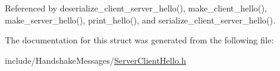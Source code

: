 Referenced by deserialize\+\_\+client\+\_\+server\+\_\+hello(), make\+\_\+client\+\_\+hello(), make\+\_\+server\+\_\+hello(), print\+\_\+hello(), and serialize\+\_\+client\+\_\+server\+\_\+hello().



The documentation for this struct was generated from the following file\+:\begin{DoxyCompactItemize}
\item 
include/\+Handshake\+Messages/\hyperlink{_server_client_hello_8h}{Server\+Client\+Hello.\+h}\end{DoxyCompactItemize}

